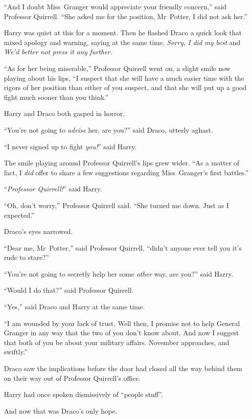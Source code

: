 “And I doubt Miss~Granger would appreciate your friendly concern,” said Professor Quirrell. “She asked me for the position, Mr~Potter, I did not ask her.”

Harry was quiet at this for a moment. Then he flashed Draco a quick look that mixed apology and warning, saying at the same time, \emph{Sorry, I did my best} and \emph{We’d better not press it any further.}

“As for her being miserable,” Professor Quirrell went on, a slight smile now playing about his lips, “I suspect that she will have a much easier time with the rigors of her position than either of you suspect, and that she will put up a good fight much sooner than you think.”

Harry and Draco both gasped in horror.

“You’re not going to \emph{advise} her, are you?” said Draco, utterly aghast.

“I never signed up to fight \emph{you!}” said Harry.

The smile playing around Professor Quirrell’s lips grew wider. “As a matter of fact, I \emph{did} offer to share a few suggestions regarding Miss~Granger’s first battles.”

“\emph{Professor Quirrell!}” said Harry.

“Oh, don’t worry,” Professor Quirrell said. “She turned me down. Just as I expected.”

Draco’s eyes narrowed.

“Dear me, Mr~Potter,” said Professor Quirrell, “didn’t anyone ever tell you it’s rude to stare?”

“You’re not going to secretly help her some \emph{other} way, are you?” said Harry.

“Would I do that?” said Professor Quirrell.

“Yes,” said Draco and Harry at the same time.

“I am wounded by your lack of trust. Well then, I promise not to help General Granger in any way that the two of you don’t know about. And now I suggest that both of you be about your military affairs. November approaches, and swiftly.”

\later

Draco saw the implications before the door had closed all the way behind them on their way out of Professor Quirrell’s office.

Harry had once spoken dismissively of “people stuff”.

And now that was Draco’s only hope.

